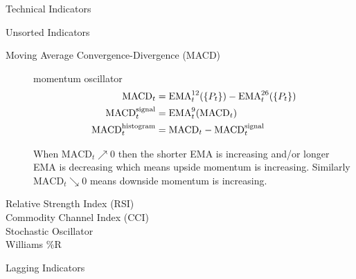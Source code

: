 \documentclass{article}
\begin{document}
\begin{section}{Technical Indicators}
\begin{subsection}{Unsorted Indicators}
\begin{description}
\item[Moving Average Convergence-Divergence (MACD)] momentum oscillator
  \begin{align}
  \text{MACD}_t &= \text{EMA}^{12}_t(\{P_t\}) - \text{EMA}^{26}_t(\{P_t\}) \notag\\
  \text{MACD}^{\text{signal}}_t &= \text{EMA}^9_t(\text{MACD}_t)\notag\\
  \text{MACD}^{\text{histogram}}_t &= \text{MACD}_t - \text{MACD}^{\text{signal}}_t \notag
  \end{align}

\noindent When $\text{MACD}_t \nearrow 0$ then the shorter EMA is increasing
and/or longer EMA is decreasing which means upside momentum is increasing.
Similarly $\text{MACD}_t \searrow 0$ means downside momentum is increasing.

\item[Relative Strength Index (RSI)] 
\item[Commodity Channel Index (CCI)]
\item[Stochastic Oscillator]
\item[Williams \%R]
\end{description}
\end{subsection}

\begin{subsection}{Lagging Indicators}

\end{subsection}
\end{section}
\end{document}
